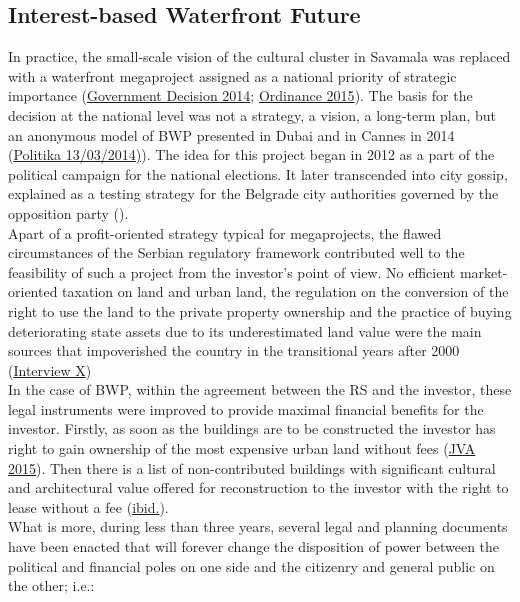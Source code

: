 \documentclass[11pt]{report}
\begin{document}
{{{\subsection{Interest-based Waterfront Future}

In practice, the small-scale vision of the cultural cluster in Savamala was replaced with a waterfront megaproject assigned as a national priority of strategic importance (\href{Decision}{Government Decision 2014}; \href{Ordinance}{Ordinance 2015}). 
The basis for the decision at the national level was not a strategy, a vision, a long-term plan, but an anonymous model of BWP presented in Dubai and in Cannes in 2014 (\href{Politika}{Politika 13/03/2014)}).
The idea for this project began in 2012 as a part of the political campaign for the national elections. It later transcended into city gossip, explained as a testing strategy for the Belgrade city authorities governed by the opposition party (\href{Vreme}{\citealt{georgijev_hod_2014}}). 
\\

Apart of a profit-oriented strategy typical for megaprojects, the flawed circumstances of the Serbian regulatory framework contributed well to the feasibility of such a project from the investor’s point of view. No efficient market-oriented taxation on land and urban land, the regulation on the conversion of the right to use the land to the private property ownership and the practice of buying deteriorating state assets due to its underestimated land value were the main sources that impoverished the country in the transitional years after 2000 
(\href{InterviewX}{Interview X})
\\

In the case of BWP, within the agreement between the RS and the investor, these legal instruments were improved  to provide maximal financial benefits for the investor.
Firstly, as soon as the buildings are to be constructed the investor has right to gain ownership of the most expensive urban land without fees (\href{JVA}{JVA 2015}).
Then there is a list of non-contributed buildings with significant cultural and architectural value offered for reconstruction to the investor with the right to lease without a fee (\href{JVA}{ibid.}).
\\

What is more, during less than three years, several legal and planning documents have been enacted that will forever change the disposition of power between the political and financial poles on one side and the citizenry and general public on the other; i.e.:

}}}
\end{document}
